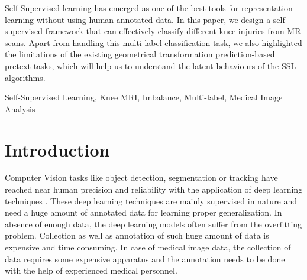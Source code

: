 \documentclass[journal]{IEEEtai}
\begin{document}
\begin{IEEEImpStatement}
Self-Supervised learning has emerged as one of the best tools for representation learning without using human-annotated data. In this paper, we design a self-supervised framework that can effectively classify different knee injuries from MR scans. Apart from handling this multi-label classification task, we also highlighted the limitations of the existing geometrical transformation prediction-based pretext tasks, which will help us to understand the latent behaviours of the SSL algorithms. 

\end{IEEEImpStatement}

\begin{IEEEkeywords}
Self-Supervised Learning, Knee MRI, Imbalance, Multi-label, Medical Image Analysis
\end{IEEEkeywords}



\section{Introduction}
\label{sec:introduction}
Computer Vision tasks like object detection, segmentation or tracking have reached near human precision and reliability with the application of deep learning techniques \cite{alexnet,vggnet,effnet,sqandextnet,densenet,resnet}. These deep learning techniques are mainly supervised in nature and need a huge amount of annotated data for learning proper generalization. In absence of enough data, the deep learning models often suffer from the overfitting problem. Collection as well as annotation of such huge amount of data is expensive and time consuming. In case of medical image data, the collection of data requires some expensive apparatus and the annotation needs to be done with the help of experienced medical personnel.
\end{document}
